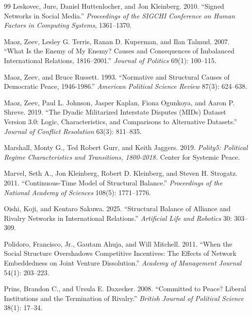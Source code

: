 \documentclass[Afour,sageh,times,doublespace]{sagej}
\begin{document}
\begin{thebibliography}{99}
 Leskovec, Jure, Daniel Huttenlocher, and Jon Kleinberg. 2010. ``Signed Networks in Social Media.'' \emph{Proceedings of the SIGCHI Conference on Human Factors in Computing Systems}, 1361--1370.

 Maoz, Zeev, Lesley G. Terris, Ranan D. Kuperman, and Ilan Talmud. 2007. ``What Is the Enemy of My Enemy? Causes and Consequences of Imbalanced International Relations, 1816--2001.'' \emph{Journal of Politics} 69(1): 100--115.

 Maoz, Zeev, and Bruce Russett. 1993. ``Normative and Structural Causes of Democratic Peace, 1946-1986.'' \emph{American Political Science Review} 87(3): 624--638.

 Maoz, Zeev, Paul L. Johnson, Jasper Kaplan, Fiona Ogunkoya, and Aaron P. Shreve. 2019. ``The Dyadic Militarized Interstate Disputes (MIDs) Dataset Version 3.0: Logic, Characteristics, and Comparisons to Alternative Datasets.'' \emph{Journal of Conflict Resolution} 63(3): 811--835.

 Marshall, Monty G., Ted Robert Gurr, and Keith Jaggers. 2019. \emph{Polity5: Political Regime Characteristics and Transitions, 1800-2018.} Center for Systemic Peace.

 Marvel, Seth A., Jon Kleinberg, Robert D. Kleinberg, and Steven H. Strogatz. 2011. ``Continuous-Time Model of Structural Balance.'' \emph{Proceedings of the National Academy of Sciences} 108(5): 1771--1776.

 Oishi, Koji, and Kentaro Sakuwa. 2025. ``Structural Balance of Alliance and Rivalry Networks in International Relations.'' \emph{Artificial Life and Robotics} 30: 303--309.

 Polidoro, Francisco, Jr., Gautam Ahuja, and Will Mitchell. 2011. ``When the Social Structure Overshadows Competitive Incentives: The Effects of Network Embeddedness on Joint Venture Dissolution.'' \emph{Academy of Management Journal} 54(1): 203--223.

 Prins, Brandon C., and Ursula E. Daxecker. 2008. ``Committed to Peace? Liberal Institutions and the Termination of Rivalry.'' \emph{British Journal of Political Science} 38(1): 17--34.


\end{thebibliography}
\end{document}
